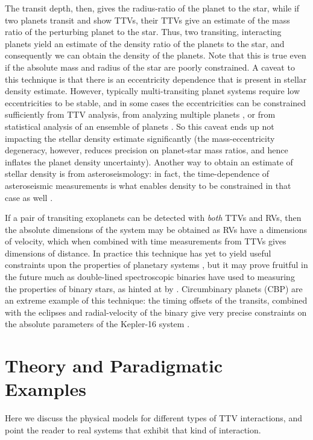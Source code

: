 \documentclass[graybox,natbib,nosecnum]{svmult}
\begin{document}
The transit depth, then, gives the radius-ratio of the planet to the star, while if two planets
transit and show TTVs, their TTVs give an estimate of the mass ratio of the perturbing planet
to the star.  Thus, two transiting, interacting planets yield an estimate of the density ratio of
the planets to the star, and consequently we can obtain the density of the planets.
Note that this is true even if the absolute mass and radius of the star are poorly
constrained.  A caveat to this technique is that there is an eccentricity dependence that 
is present in stellar density estimate.  However, typically multi-transiting planet systems require low eccentricities to be stable,
and in some cases the eccentricities can be constrained sufficiently from TTV analysis, from
analyzing multiple planets \citep{2014MNRAS.440.2164K}, or
from statistical analysis of an ensemble of planets \citep{Hadden2017}.  So this caveat ends up not impacting the stellar density 
estimate significantly (the mass-eccentricity degeneracy, however, reduces precision on planet-star mass ratios, and hence inflates the planet density uncertainty). 
Another way to obtain an estimate of stellar density is from asteroseismology:
in fact, the time-dependence of asteroseismic measurements is what enables density
to be constrained in that case as well \citep{1986ApJ...306L..37U}.

If a pair of transiting exoplanets can be detected with {\it both} TTVs and RVs, then the
absolute dimensions of the system may be obtained \citep{2005MNRAS.359..567A,
2013ApJ...762..112M} as RVs have a dimensions of velocity, which 
when combined with time measurements from TTVs gives dimensions of distance.
In practice this technique has yet to yield useful constraints upon the properties
of planetary systems \citep{2015MNRAS.453.2644A}, but it may prove fruitful
in the future much as double-lined spectroscopic binaries have used to measuring 
the properties of binary stars, as hinted at by \cite{2016A&A...595L...5A}.  Circumbinary planets 
(CBP) are an extreme example of this technique: the timing offsets of the transits, combined with the eclipses
and radial-velocity of the binary give very precise constraints on the absolute parameters
of the Kepler-16 system \citep{2011Sci...333.1602D}.

\section{Theory and Paradigmatic Examples} 

Here we discuss the physical models for different types of TTV interactions, and point the reader to real systems that exhibit that kind of interaction. 
\end{document}
